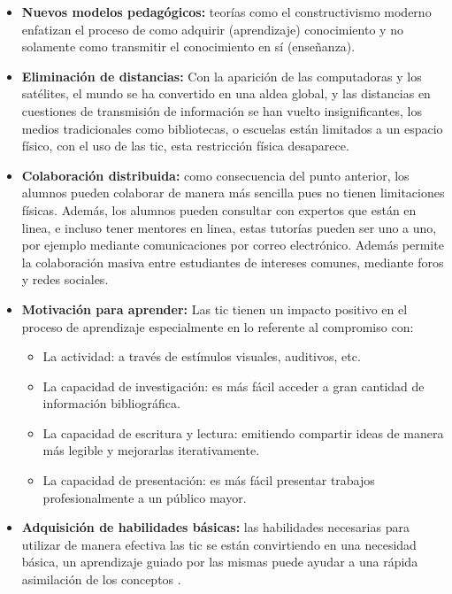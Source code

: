 \begin{itemize}

\item \textbf{Nuevos modelos pedagógicos:} teorías como el constructivismo moderno
    enfatizan el proceso de como adquirir (aprendizaje) conocimiento y no
    solamente como transmitir el conocimiento en sí (enseñanza).

\item \textbf{Eliminación de distancias:} Con la aparición de las computadoras y los
    satélites,  el mundo se ha convertido en una aldea global, y las distancias
    en cuestiones de transmisión de información se han vuelto
    insignificantes\cite{mohammed2013information},  los medios tradicionales
    como bibliotecas, o escuelas están limitados a un espacio  físico, con el
    uso de las \Gls{tic}, esta restricción física desaparece\cite{tinio:ict}.

\item \textbf{Colaboración distribuida:} como consecuencia del punto anterior, los
    alumnos pueden colaborar de manera más sencilla pues no tienen limitaciones
    físicas. Además, los alumnos pueden consultar con expertos que están en
    linea, e incluso tener mentores en linea, estas tutorías pueden ser uno a
    uno, por ejemplo mediante comunicaciones por correo electrónico. Además
    permite la colaboración masiva entre estudiantes de intereses comunes,
    mediante foros y redes sociales\cite{unesco:ict}.

\item \textbf{Motivación para aprender:} Las \Gls{tic} tienen un impacto positivo en el
    proceso de aprendizaje especialmente en lo referente al compromiso
    con\cite{passey2004motivational,egenfeldt2007third}:
	    
    \begin{itemize}
    \item La actividad: a través de estímulos visuales, auditivos, etc.
    \item La capacidad de investigación: es más fácil acceder a gran cantidad de
        información bibliográfica.
    \item La capacidad de escritura y lectura: emitiendo compartir  ideas de
        manera más legible y mejorarlas iterativamente.
    \item La capacidad de presentación: es más fácil presentar trabajos
        profesionalmente a un público mayor.
    \end{itemize}
	    
\item \textbf{Adquisición de habilidades básicas:} las habilidades necesarias para
    utilizar de manera efectiva las \Gls{tic} se están convirtiendo en una
    necesidad básica, un aprendizaje guiado por las mismas puede ayudar a una
    rápida asimilación de los conceptos .

\end{itemize}

